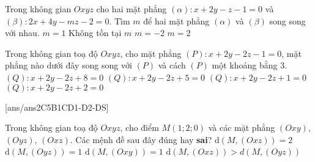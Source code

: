 \begin{ex}%
	Trong không gian $Oxyz$ cho hai mặt phẳng $(\alpha)\colon x+2y-z-1=0$ và $(\beta)\colon 2x+4y-mz-2=0$. Tìm $m$ để hai mặt phẳng $(\alpha)$ và $(\beta)$ song song với nhau.
	\choice
	{$m=1$}
	{\True Không tồn tại $m$}
	{$m=-2$}
	{$m=2$}
\end{ex}

\begin{ex}%
	Trong không gian toạ độ $Oxyz$, cho mặt phẳng $(P)\colon x+2y-2z-1=0$, mặt phẳng nào dưới đây song song với $(P)$ và cách $(P)$ một khoảng bằng $3$.
	\choice
	{\True $(Q)\colon x+2y-2z+8=0$}
	{$(Q)\colon x+2y-2z+5=0$}
	{$(Q)\colon x+2y-2z+1=0$}
	{$(Q)\colon x+2y-2z+2=0$}
\end{ex}
\TNTF
{}[ans/ans2C5B1CD1-D2-DS]
\begin{ex}%
	Trong không gian toạ độ $Oxyz$, cho điểm $M\left(1;2;0\right)$ và các mặt phẳng $(Oxy)$, $(Oyz)$, $(Oxz)$. Các mệnh đề sau đây đúng hay \textbf{sai}?
	\choiceTF
	{\True $\mathrm{d}\left(M,(Oxz)\right)=2$}
	{\True $\mathrm{d}\left(M,(Oyz)\right)=1$}
	{$\mathrm{d}\left(M,(Oxy)\right)=1$}
	{\True $\mathrm{d}\left(M,(Oxz)\right)>d\left(M,(Oyz)\right)$}
\end{ex}
